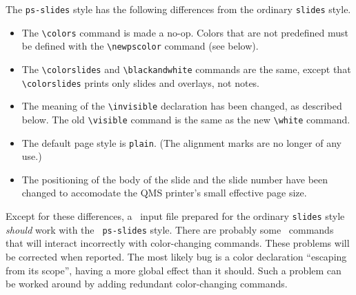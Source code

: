 The {\tt ps-slides} style has the following differences from the
ordinary {\tt slides} style.
\begin{itemize}
\item The \verb+\colors+
 command is made a no-op. Colors that are not predefined
    must be defined with the \verb+\newpscolor+ command (see below).
 
\item The \verb+\colorslides+ and \verb+\blackandwhite+ commands are
the same, except that
\verb+\colorslides+ prints only slides and overlays, not notes.
 
\item The meaning of the \verb+\invisible+ declaration has been
changed, as described below.  The old \verb+\visible+ command is the
same as the new \verb+\white+ command.
 
\item The default page style is {\tt plain}.  (The alignment marks are
no longer of any use.)
 
\item The positioning of the body of the slide and the slide number have
   been changed to accomodate the QMS printer's small effective page 
   size.
\end{itemize}
Except for these differences, a \SLiTeX\ input file prepared for the
ordinary {\tt slides} style {\em should\/} work with the {\tt
ps-slides} style.  There are probably some \SLiTeX\ commands that will
interact incorrectly with color-changing commands.  These problems will
be corrected when reported.  The most likely bug is a color declaration
``escaping from its scope'', having a more global effect than it should.
Such a problem can be worked around by adding redundant color-changing
commands.
 
